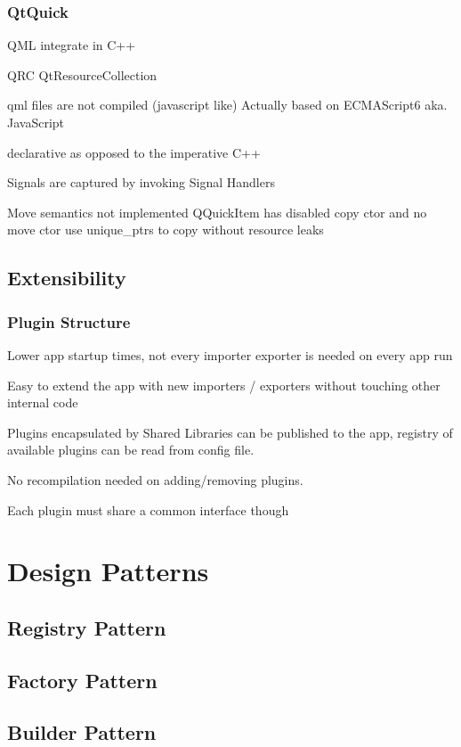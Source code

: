 \subsubsection{QtQuick}
QML integrate in C++

QRC QtResourceCollection

qml files are not compiled (javascript like)
Actually based on ECMAScript6 aka. JavaScript

declarative as opposed to the imperative  C++

Signals are captured by invoking Signal Handlers

Move semantics not implemented
QQuickItem has disabled copy ctor and no move ctor
use unique_ptrs to copy without resource leaks


\subsection{Extensibility}
\subsubsection{Plugin Structure}
Lower app startup times, not every importer exporter is needed on every app run

Easy to extend the app with new importers / exporters without touching other internal code

Plugins encapsulated by Shared Libraries can be published to the app, registry of available plugins can be read from config file.

No recompilation needed on adding/removing plugins.

Each plugin must share a common interface though

\section{Design Patterns}
\subsection{Registry Pattern}

\subsection{Factory Pattern}

\subsection{Builder Pattern}

